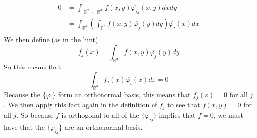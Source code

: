 \documentclass{article}
\DeclareMathOperator{\R}{\mathbb{R}}
\begin{document}
\begin{align*}
0 &= \int_{\R^d \times \R^d} f(x,y)\overline{\varphi_{ij}}(x,y)dxdy \\
&= \int_{\R^d}\left(\int_{\R^d}f(x,y)\overline{\varphi_j}(y)dy\right)\overline{\varphi_i}(x)dx \\
\end{align*}
We then define (as in the hint)
\[
f_j(x) = \int_{\R^d} f(x,y)\overline{\varphi_j}(y)dy 
\]
So this means that 
\[
\int_{\R^d} f_j(x)\overline{\varphi_i}(x)dx = 0
\]
Because the $\{\varphi_i\}$ form an orthonormal basis, this means that $f_j(x) = 0$ for all $j$. We then apply this fact again in the definition of $f_j$ to see that $f(x,y) = 0$ for all $j$. So because $f$ is orthogonal to all of the $\{\varphi_{ij}\}$ implies that $f = 0$, we must have that the $\{\varphi_{ij}\}$ are an orthonormal basis. 
\end{document}
